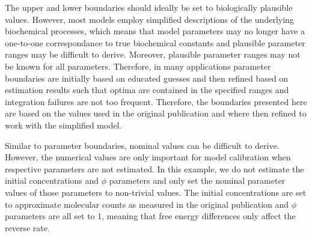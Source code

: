 \documentclass[11pt]{article}
\begin{document}
The upper and lower boundaries should ideally be set to biologically
plausible values. However, most models employ simplified descriptions of
the underlying biochemical processes, which means that model parameters
may no longer have a one-to-one correspondance to true biochemical
constants and plausible parameter ranges may be difficult to derive.
Moreover, plausible parameter ranges may not be known for all
parameters. Therefore, in many applications parameter boundaries are
initially based on educated guesses and then refined based on estimation
results such that optima are contained in the specified ranges and
integration failures are not too frequent. Therefore, the boundaries
presented here are based on the values used in the original publication
and where then refined to work with the simplified model.

Similar to parameter boundaries, nominal values can be difficult to
derive. However, the numerical values are only important for model
calibration when respective parameters are not estimated. In this
example, we do not estimate the initial concentrations and \(\phi\)
parameters and only set the nominal parameter values of those parameters
to non-trivial values. The initial concentrations are set to approximate
molecular counts as measured in the original publication and \(\phi\)
parameters are all set to 1, meaning that free energy differences only
affect the reverse rate.
\end{document}
